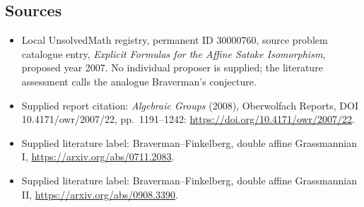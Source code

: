 \documentclass[11pt]{article}
\begin{document}
\subsection{Sources}
\begin{itemize}\item Local UnsolvedMath registry, permanent ID 30000760, source problem catalogue entry, \emph{Explicit Formulas for the Affine Satake Isomorphism}, proposed year 2007. No individual proposer is supplied; the literature assessment calls the analogue Braverman's conjecture.\item Supplied report citation: \emph{Algebraic Groups} (2008), Oberwolfach Reports, DOI 10.4171/owr/2007/22, pp.\ 1191--1242: \url{https://doi.org/10.4171/owr/2007/22}.\item Supplied literature label: Braverman--Finkelberg, double affine Grassmannian I, \url{https://arxiv.org/abs/0711.2083}.\item Supplied literature label: Braverman--Finkelberg, double affine Grassmannian II, \url{https://arxiv.org/abs/0908.3390}.\end{itemize}
\end{document}
